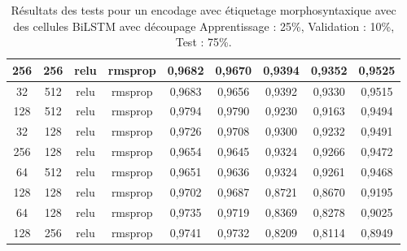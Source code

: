 \begin{table}[H]
{\begin{tabular}{|c|c|c|c|c|c|c|c|c|}
				256            & 256                     & relu                & rmsprop            & 0,9682                             & 0,9670                                & 0,9394                    & 0,9352                       & 0,9525                \\ \hline
				32             & 512                     & relu                & rmsprop            & 0,9683                             & 0,9656                                & 0,9392                    & 0,9330                       & 0,9515                \\ \hline
				128            & 512                     & relu                & rmsprop            & 0,9794                             & 0,9790                                & 0,9230                    & 0,9163                       & 0,9494                \\ \hline
				32             & 128                     & relu                & rmsprop            & 0,9726                             & 0,9708                                & 0,9300                    & 0,9232                       & 0,9491                \\ \hline
				256            & 128                     & relu                & rmsprop            & 0,9654                             & 0,9645                                & 0,9324                    & 0,9266                       & 0,9472                \\ \hline
				64             & 512                     & relu                & rmsprop            & 0,9651                             & 0,9636                                & 0,9324                    & 0,9261                       & 0,9468                \\ \hline
				128            & 128                     & relu                & rmsprop            & 0,9702                             & 0,9687                                & 0,8721                    & 0,8670                       & 0,9195                \\ \hline
				64             & 128                     & relu                & rmsprop            & 0,9735                             & 0,9719                                & 0,8369                    & 0,8278                       & 0,9025                \\ \hline
				128            & 256                     & relu                & rmsprop            & 0,9741                             & 0,9732                                & 0,8209                    & 0,8114                       & 0,8949                \\ \hline
			\end{tabular}%
		}
		\caption{Résultats des tests pour un encodage avec étiquetage morphosyntaxique avec des cellules BiLSTM avec découpage Apprentissage : 25\%, Validation : 10\%, Test : 75\%.}
		\label{tab:bilstm_1_postag}
	\end{table}
	
